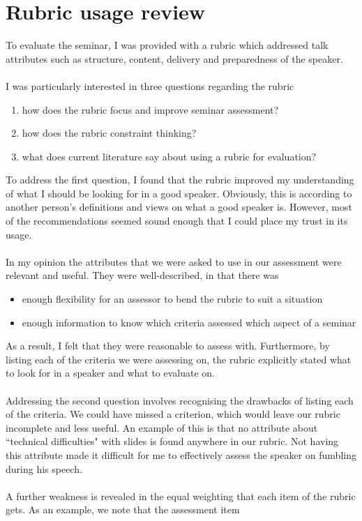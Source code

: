 \section{Rubric usage review} \label{rubReview}

To evaluate the seminar, I was provided with a rubric which addressed talk attributes such as
structure, content, delivery and preparedness of the speaker.\\
\\
I was particularly interested in three questions regarding the rubric
\begin{enumerate}
	\item how does the rubric focus and improve seminar assessment?
	\item how does the rubric constraint thinking?
	\item what does current literature say about using a rubric for evaluation?
\end{enumerate}

To address the first question, I found that the rubric improved my understanding of what I should be
looking for in a good speaker.
Obviously, this is according to another person's definitions and views on what a good speaker is.
However, most of the recommendations seemed sound enough that I could place my trust in its usage.\\
\\
In my opinion the attributes that we were asked to use in our assessment were relevant and useful.
They were well-described, in that there was
\begin{itemize}
	\item enough flexibility for an assessor to bend the rubric to suit a situation
	\item enough information to know which criteria assessed which aspect of a seminar
\end{itemize}

As a result, I felt that they were reasonable to assess with.
Furthermore, by listing each of the criteria we were assessing on, the rubric explicitly stated what
to look for in a speaker and what to evaluate on.\\
\\
Addressing the second question involves recognising the drawbacks of listing each of the criteria.
We could have missed a criterion, which would leave our rubric incomplete and less useful.
An example of this is that no attribute about ``technical difficulties" with slides is found
anywhere in our rubric.
Not having this attribute made it difficult for me to effectively assess the speaker on fumbling
during his speech.\\
\\
A further weakness is revealed in the equal weighting that each item of the rubric gets.
As an example, we note that the assessment item

